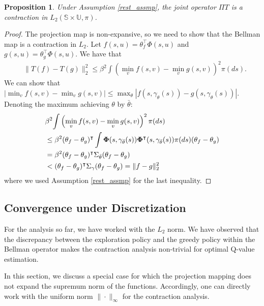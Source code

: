 \documentclass[11pt]{article}
\newtheorem{prop}{Proposition}
\begin{document}
\begin{prop}
Under Assumption \ref{rest_assmp}, the joint operator $\Pi T$ is a contraction in $L_2(\mathds{S}\times\mathds{U},\pi)$.
\end{prop}
\begin{proof}
The projection map is non-expansive, so we need to show that the Bellman map is a contraction in $L_2$. Let $f(s,u) = \theta_f^\intercal \Phi(s,u)$  and  $g(s,u) = \theta_g^\intercal \Phi(s,u)$.  We have that
\begin{align*}
&\| T (f) -  T (g)\|^2_2 \leq \beta^2 {   \int \left(\min_vf(s,v) - \min_vg(s,v)\right)^2 \pi(ds) }.
\end{align*}
We can show that 
$\left|\min_vf(s,v) - \min_vg(s,v)\right|\leq \max_\theta \left|f(s,\gamma_\theta(s))-g(s,\gamma_\theta(s))\right|$. Denoting the maximum achieving $\theta$ by $\bar{\theta}$:
\begin{align*}
&\beta^2 {   \int \left(\min_vf(s,v) - \min_vg(s,v)\right)^2 \pi(ds) } \\
&\leq\beta^2 (\theta_f-\theta_g)^\intercal \int {\bf \Phi}(s,\gamma_{\bar{\theta}}(s))  {\bf \Phi}^\intercal(s,\gamma_{\bar{\theta}}(s)) \pi(ds)(\theta_f-\theta_g)\\
&=  \beta^2(\theta_f-\theta_g)^\intercal \Sigma_{\bar{\theta}}  (\theta_f-\theta_g)\\
&<(\theta_f-\theta_g)^\intercal \Sigma_{\gamma}  (\theta_f-\theta_g) = \|f-g\|_2^2
\end{align*}
where we used Assumption \ref{rest_assmp} for the last inequality.
\end{proof}

\subsection{Convergence under Discretization}\label{disc_sec}
For the analysis so far, we have worked with the $L_2$ norm.  We have observed that the discrepancy between the exploration policy and the greedy policy within the Bellman operator makes the contraction analysis non-trivial for optimal Q-value estimation.

In this section, we discuss a special case for which the projection mapping does not expand the supremum norm of the functions. Accordingly, one can directly work with the uniform norm $\|\cdot\|_\infty$ for the contraction analysis.
\end{document}
